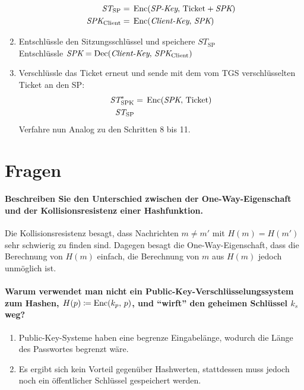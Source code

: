 \begin{enumerate}
						\begin{align*}
							\textit{ST}_\textrm{SP}      & =\, \operatorname{Enc}(\textit{SP-Key},\, \textrm{Ticket}+\textit{SPK}) \\
							\textit{SPK}_\textrm{Client} & =\, \operatorname{Enc}(\textit{Client-Key},\, \textit{SPK})
						\end{align*}
					\item Entschlüssle den Sitzungsschlüssel und speichere \( \textit{ST}_\textrm{SP} \) \\ Entschlüssle \( \textit{SPK} = \operatorname{Dec}(\textit{Client-Key},\, \textit{SPK}_\textrm{Client}) \)
					\item Verschlüssle das Ticket erneut und sende mit dem vom TGS verschlüsselten Ticket an den SP:
						\begin{align*}
							\textit{ST}^*_\textrm{SPK} & =\, \operatorname{Enc}(\textit{SPK},\, \textrm{Ticket}) \\
							\textit{ST}_\textrm{SP}    &
						\end{align*}
						Verfahre nun Analog zu den Schritten 8 bis 11.
				\end{enumerate}

	\section{Fragen} %
		\paragraph{Beschreiben Sie den Unterschied zwischen der One-Way-Eigenschaft und der Kollisionsresistenz einer Hashfunktion.}
			Die Kollisionsresistenz besagt, dass Nachrichten \( m \neq m' \) mit \( H(m) = H(m') \) sehr schwierig zu finden sind. Dagegen besagt die One-Way-Eigenschaft, dass die Berechnung von \( H(m) \) einfach, die Berechnung von \(m\) aus \(H(m)\) jedoch unmöglich ist.

		\paragraph{Warum verwendet man nicht ein Public-Key-Verschlüsselungssystem zum Hashen, \(H(p) \coloneqq \operatorname{Enc}(k_p,\, p) \), und \enquote{wirft} den geheimen Schlüssel \(k_s\) weg?}
			\begin{enumerate}
				\item Public-Key-Systeme haben eine begrenze Eingabelänge, wodurch die Länge des Passwortes begrenzt wäre.
				\item Es ergibt sich kein Vorteil gegenüber Hashwerten, stattdessen muss jedoch noch ein öffentlicher Schlüssel gespeichert werden.
			\end{enumerate}

